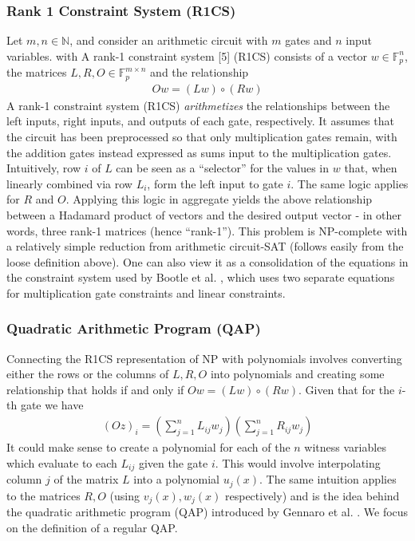 \subsubsection{Rank 1 Constraint System (R1CS)}
Let $m, n \in \mathbb{N}$, and consider an arithmetic circuit with $m$ gates and $n$ input variables. with A rank-1 constraint system [5] (R1CS) consists of a vector $w \in \mathbb{F}_{p}^{n}$, the matrices $L, R, O \in \mathbb{F}_{p}^{m \times n}$ and the relationship
\begin{align}
Ow = (Lw) \circ (Rw)
\end{align}
A rank-1 constraint system (R1CS) \textit{arithmetizes} the relationships between the left inputs, right inputs, and outputs of each gate, respectively. It assumes that the circuit has been preprocessed so that only multiplication gates remain, with the addition gates instead expressed as sums input to the multiplication gates. Intuitively, row $i$ of $L$ can be seen as a ``selector'' for the values in $w$ that, when linearly combined via row $L_i$, form the left input to gate $i$. The same logic applies for $R$ and $O$. Applying this logic in aggregate yields the above relationship between a Hadamard product of vectors and the desired output vector - in other words, three rank-1 matrices (hence ``rank-1''). This problem is NP-complete with a relatively simple reduction from arithmetic circuit-SAT (follows easily from the loose definition above). One can also view it as a consolidation of the equations in the constraint system used by Bootle et al. \cite{bootlezkargs}, which uses two separate equations for multiplication gate constraints and linear constraints.

\subsubsection{Quadratic Arithmetic Program (QAP)}
Connecting the R1CS representation of NP with polynomials involves converting either the rows or the columns of $L, R, O$ into polynomials and creating some relationship that holds if and only if $Ow = (Lw) \circ (Rw)$. Given that for the $i$-th gate we have
\begin{align}
(Oz)_i = \left(\sum_{j=1}^n L_{ij}w_j\right)\left(\sum_{j=1}^n R_{ij}w_j\right)
\end{align}
It could make sense to create a polynomial for each of the $n$ witness variables which evaluate to each $L_{ij}$ given the gate $i$. This would involve interpolating column $j$ of the matrix $L$ into a polynomial $u_j(x)$. The same intuition applies to the matrices $R, O$ (using $v_j(x), w_j(x)$ respectively) and is the idea behind the quadratic arithmetic program (QAP) introduced by Gennaro et al. \cite{snarknopcp}. We focus on the definition of a regular QAP.

